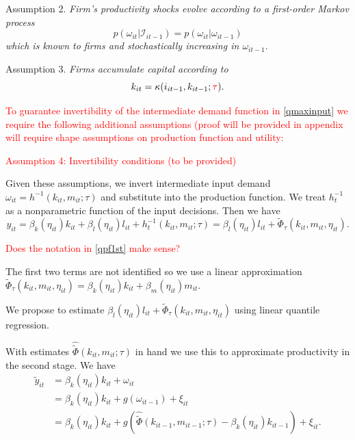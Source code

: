 \documentclass[11pt]{article}
\begin{document}
Assumption 2. \textit{Firm's productivity shocks evolve according to a first-order Markov process}
\begin{equation}
p(\omega_{it}|\mathcal{I}_{it-1})=p(\omega_{it}|\omega_{it-1})
\end{equation}
\textit{which is known to firms and stochastically increasing in $\omega_{it-1}$}.

Assumption 3. \textit{Firms accumulate capital according to}
\begin{equation}
    k_{it}=\kappa(i_{it-1}, k_{it-1}; \textcolor{red}{\tau}).
\end{equation}

\textcolor{red}{To guarantee invertibility of the intermediate demand function in \eqref{qmaxinput} we require the following additional assumptions (proof will be provided in appendix will require shape assumptions on production function and utility:}

\textcolor{red}{Assumption 4: Invertibility conditions (to be provided)}

Given these assumptions, we invert intermediate input demand $\omega_{it}=h^{-1}(k_{it}, m_{it}; \tau)$ and substitute into the production function. We treat $h_{t}^{-1}$ as a nonparametric function of the input decisions. Then we have
\begin{equation} \label{qpf1st}
y_{it}=\beta_{k}(\eta_{it})k_{it}+\beta_{l}(\eta_{it})l_{it}+h_{t}^{-1}(k_{it}, m_{it}; \tau)=\beta_{l}(\eta_{it})l_{it}+\tilde{\Phi}_{\tau}(k_{it}, m_{it}, \eta_{it}).
\end{equation}

\textcolor{red}{Does the notation in \eqref{qpf1st} make sense?}

The first two terms are not identified so we use a linear approximation $\tilde{\Phi}_{\tau}(k_{it}, m_{it}, \eta_{it})=\beta_{k}(\eta_{it})k_{it}+\beta_{m}(\eta_{it})m_{it}$.

We propose to estimate $\beta_{l}(\eta_{it})l_{it}+\tilde{\Phi}_{\tau}(k_{it}, m_{it}, \eta_{it})$ using linear quantile regression.

With estimates $\hat{\tilde{\Phi}}(k_{it}, m_{it}; \tau)$ in hand we use this to approximate productivity in the second stage. We have
\begin{equation} \label{qpf2nd}
\begin{split}
\tilde{y}_{it}&=\beta_{k}(\eta_{it})k_{it}+\omega_{it}\\
&=\beta_{k}(\eta_{it})k_{it}+g(\omega_{it-1})+\xi_{it}\\
&=\beta_{k}(\eta_{it})k_{it}+g(\hat{\tilde{\Phi}}(k_{it-1}, m_{it-1}; \tau)-\beta_{k}(\eta_{it})k_{it-1})+\xi_{it}.
\end{split}
\end{equation}
\end{document}
